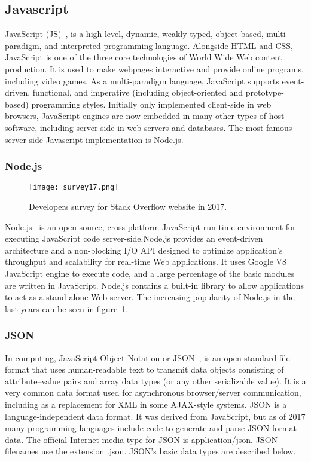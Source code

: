 \subsection{Javascript}
JavaScript (JS)~\cite{crockford2008javascript}, is a high-level, dynamic, weakly typed, object-based, multi-paradigm, and interpreted programming language. Alongside HTML and CSS, JavaScript is one of the three core technologies of World Wide Web content production. It is used to make webpages interactive and provide online programs, including video games. As a multi-paradigm language, JavaScript supports event-driven, functional, and imperative (including object-oriented and prototype-based) programming styles. Initially only implemented client-side in web browsers, JavaScript engines are now embedded in many other types of host software, including server-side in web servers and databases. The most famous server-side Javascript implementation is Node.js.

\subsubsection{Node.js}
\begin{figure}
	\texttt{[image: survey17.png]}
	\caption{Developers survey for Stack Overflow website in 2017.}
	\label{survey17}
\end{figure}
Node.js~\cite{tilkov2010node} is an open-source, cross-platform JavaScript run-time environment for executing JavaScript code server-side.Node.js provides an event-driven architecture and a non-blocking I/O API designed to optimize application's throughput and scalability for real-time Web applications. It uses Google V8 JavaScript engine to execute code, and a large percentage of the basic modules are written in JavaScript. Node.js contains a built-in library to allow applications to act as a stand-alone Web server. The increasing popularity of Node.js in the last years can be seen in figure~\ref{survey17}.

\subsubsection{JSON}
\label{json}
In computing, JavaScript Object Notation or JSON~\cite{crockford2006application}, is an open-standard file format that uses human-readable text to transmit data objects consisting of attribute–value pairs and array data types (or any other serializable value). It is a very common data format used for asynchronous browser/server communication, including as a replacement for XML in some AJAX-style systems.
JSON is a language-independent data format. It was derived from JavaScript, but as of 2017 many programming languages include code to generate and parse JSON-format data. The official Internet media type for JSON is application/json. JSON filenames use the extension .json. JSON's basic data types are described below. \par
